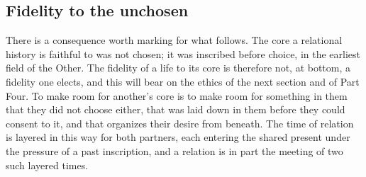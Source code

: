 \subsection*{Fidelity to the unchosen}

There is a consequence worth marking for what follows. The core a relational history is faithful to was not chosen; it was inscribed before choice, in the earliest field of the Other. The fidelity of a life to its core is therefore not, at bottom, a fidelity one elects, and this will bear on the ethics of the next section and of Part Four. To make room for another's core is to make room for something in them that they did not choose either, that was laid down in them before they could consent to it, and that organizes their desire from beneath. The time of relation is layered in this way for both partners, each entering the shared present under the pressure of a past inscription, and a relation is in part the meeting of two such layered times.
